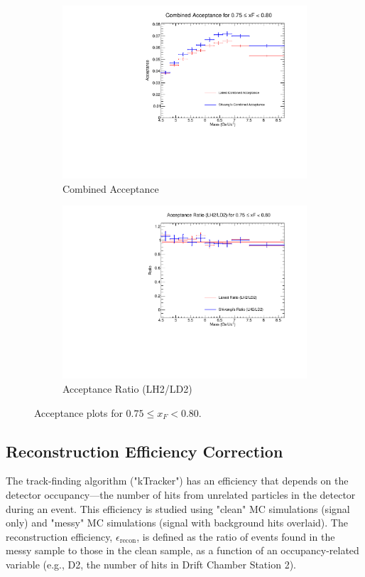\documentclass[11pt]{article}
\begin{document}
\begin{figure}[p]
\begin{subfigure}[b]{0.48\textwidth}
       \includegraphics[width=\linewidth]{./acceptancePlots/Combined_acceptance_xF_bin_15.pdf}
       \caption{Combined Acceptance}
    \end{subfigure}\hfill
    \begin{subfigure}[b]{0.48\textwidth}
       \includegraphics[width=\linewidth]{./acceptancePlots/Acceptance_ratio_xF_bin_15.pdf}
       \caption{Acceptance Ratio (LH2/LD2)}
    \end{subfigure}
    \caption{Acceptance plots for $0.75 \le x_F < 0.80$.}
\end{figure}

\FloatBarrier

\subsection{Reconstruction Efficiency Correction}
\label{sec:ktracker_eff}
The track-finding algorithm ("kTracker") has an efficiency that depends on the detector occupancy---the number of hits from unrelated particles in the detector during an event. This efficiency is studied using "clean" MC simulations (signal only) and "messy" MC simulations (signal with background hits overlaid). The reconstruction efficiency, $\epsilon_{\text{recon}}$, is defined as the ratio of events found in the messy sample to those in the clean sample, as a function of an occupancy-related variable (e.g., D2, the number of hits in Drift Chamber Station 2).
\end{document}
